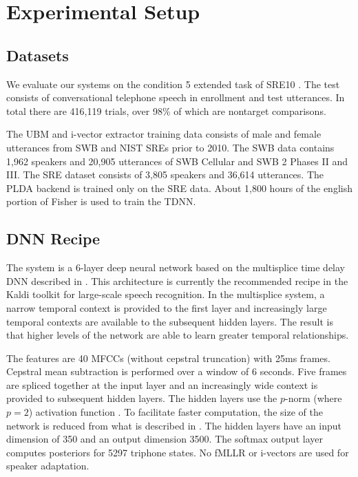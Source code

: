 \documentclass{article}
\begin{document}
\section{Experimental Setup}

\subsection{Datasets}
\label{datasets}
We evaluate our systems on the condition 5 extended task of 
SRE10 \cite{sre10}. The test consists of conversational telephone speech
in enrollment and test utterances. In total there are 416,119 trials,
over 98\% of which are nontarget comparisons. 

The UBM and i-vector extractor training data consists of male and female
utterances from SWB and NIST SREs prior to 2010. The SWB data contains
1,962 speakers and 20,905 utterances of SWB Cellular and SWB 2 
Phases II and III. The SRE dataset consists of 3,805 speakers 
and 36,614 utterances.
The PLDA backend is trained only on the SRE data. About 1,800 hours
of the english portion of Fisher \cite{fisher} is
used to train the TDNN.

\subsection{DNN Recipe}
\label{dnn_recipe}

The system is a 6-layer deep neural network based on the multisplice 
time delay DNN described
in \cite{multisplice}. This architecture is currently the recommended
recipe in the Kaldi toolkit \cite{kaldi} for large-scale speech recognition. 
In the multisplice system, a narrow temporal
context is provided to the first layer and increasingly large temporal
contexts are available to the subsequent hidden layers. The result is that
higher levels of the network are able to learn greater temporal
relationships. 

The features are 40 MFCCs (without cepstral
truncation) with 25ms frames. Cepstral mean subtraction is 
performed over a window of
6 seconds. Five frames are spliced together at the
input layer and an increasingly wide context is provided to 
subsequent hidden layers. The hidden layers use the $p$-norm (where $p=2$)
activation function \cite{pnorm}. 
To facilitate faster computation, the size of the network is reduced
from what is described in \cite{multisplice}. The hidden layers have an 
input dimension of 350 and an output dimension 3500. 
The softmax output layer computes posteriors for 5297 triphone states. No
fMLLR or i-vectors are used for speaker adaptation.
\end{document}

